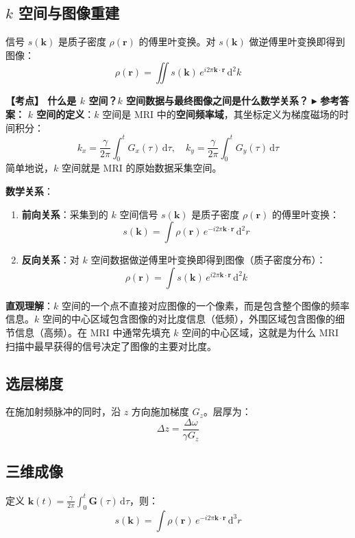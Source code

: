 \documentclass[12pt,a4paper]{article}
\newcommand{\boxeq}[1]{\begin{equation}\boxed{#1}\end{equation}}
\newcommand{\exam}[1]{\textbf{\color{blue!70!black}【考点】#1}}
\newcommand{\answer}[1]{\vspace{2pt}\noindent\textbf{\color{teal!80!black}▸ 参考答案：}#1\vspace{4pt}}
\newcommand{\qa}[2]{\exam{#1}\answer{#2}}
\begin{document}
\subsection{\(k\) 空间与图像重建}
信号 \(s(\mathbf{k})\) 是质子密度 \(\rho(\mathbf{r})\) 的傅里叶变换。对 \(s(\mathbf{k})\) 做逆傅里叶变换即得到图像：
\boxeq{\rho(\mathbf{r}) = \iint s(\mathbf{k}) \, e^{i 2\pi \mathbf{k}\cdot\mathbf{r}} \, \mathrm{d}^2 k}

\qa{
    什么是 $k$ 空间？$k$ 空间数据与最终图像之间是什么数学关系？
}{
    \textbf{$k$ 空间的定义}：$k$ 空间是 MRI 中的\textbf{空间频率域}，其坐标定义为梯度磁场的时间积分：
    \[
    k_x = \frac{\gamma}{2\pi}\int_0^t G_x(\tau)\,\mathrm{d}\tau,\quad
    k_y = \frac{\gamma}{2\pi}\int_0^t G_y(\tau)\,\mathrm{d}\tau
    \]
    简单地说，$k$ 空间就是 MRI 的原始数据采集空间。

    \textbf{数学关系}：
    \begin{enumerate}
        \item \textbf{前向关系}：采集到的 $k$ 空间信号 $s(\mathbf{k})$ 是质子密度 $\rho(\mathbf{r})$ 的傅里叶变换：
        \[
        s(\mathbf{k}) = \int \rho(\mathbf{r})\, e^{-i2\pi\mathbf{k}\cdot\mathbf{r}}\,\mathrm{d}^2 r
        \]
        \item \textbf{反向关系}：对 $k$ 空间数据做逆傅里叶变换即得到图像（质子密度分布）：
        \[
        \rho(\mathbf{r}) = \int s(\mathbf{k})\, e^{i2\pi\mathbf{k}\cdot\mathbf{r}}\,\mathrm{d}^2 k
        \]
    \end{enumerate}

    \textbf{直观理解}：$k$ 空间的一个点不直接对应图像的一个像素，而是包含整个图像的频率信息。$k$ 空间的中心区域包含图像的对比度信息（低频），外围区域包含图像的细节信息（高频）。在 MRI 中通常先填充 $k$ 空间的中心区域，这就是为什么 MRI 扫描中最早获得的信号决定了图像的主要对比度。
}

\subsection{选层梯度}
在施加射频脉冲的同时，沿 \(z\) 方向施加梯度 \(G_z\)。层厚为：
\begin{equation}
    \Delta z = \frac{\Delta \omega}{\gamma G_z}
\end{equation}

\subsection{三维成像}
定义 \(\mathbf{k}(t) = \frac{\gamma}{2\pi} \int_0^t \mathbf{G}(\tau)\, \mathrm{d}\tau\)，则：
\begin{equation}
    s(\mathbf{k}) = \int \rho(\mathbf{r}) \, e^{-i 2\pi \mathbf{k}\cdot\mathbf{r}} \, \mathrm{d}^3 r
\end{equation}
\end{document}
